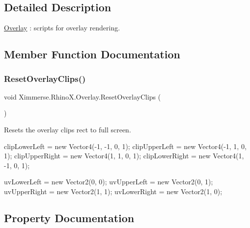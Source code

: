 \subsection{Detailed Description}
\mbox{\hyperlink{class_ximmerse_1_1_rhino_x_1_1_overlay}{Overlay}} \+: scripts for overlay rendering. 



\subsection{Member Function Documentation}
\mbox{\label{class_ximmerse_1_1_rhino_x_1_1_overlay_a4fffeab006cc47fe53a3dbe2a4df7331}} 
\subsubsection{\texorpdfstring{Reset\+Overlay\+Clips()}{ResetOverlayClips()}}
{\footnotesize\ttfamily void Ximmerse.\+Rhino\+X.\+Overlay.\+Reset\+Overlay\+Clips (\begin{DoxyParamCaption}{ }\end{DoxyParamCaption})\hspace{0.3cm}{\ttfamily [inline]}}



Resets the overlay clips rect to full screen. 

clip\+Lower\+Left = new Vector4(-\/1, -\/1, 0, 1); clip\+Upper\+Left = new Vector4(-\/1, 1, 0, 1); clip\+Upper\+Right = new Vector4(1, 1, 0, 1); clip\+Lower\+Right = new Vector4(1, -\/1, 0, 1);

uv\+Lower\+Left = new Vector2(0, 0); uv\+Upper\+Left = new Vector2(0, 1); uv\+Upper\+Right = new Vector2(1, 1); uv\+Lower\+Right = new Vector2(1, 0);

\subsection{Property Documentation}
\mbox{\label{class_ximmerse_1_1_rhino_x_1_1_overlay_a33625bf90415d02965199b48bbaec4cc}} 

